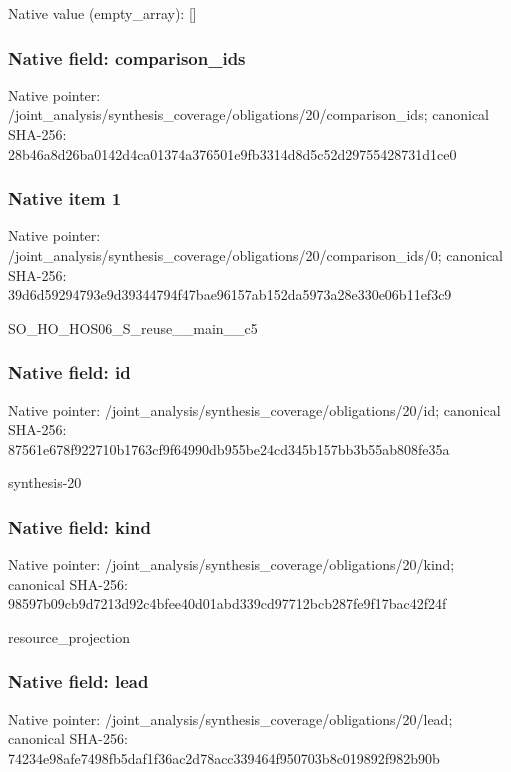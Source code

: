 \documentclass[10pt,a4paper]{article}
\begin{document}
Native value (empty\_\allowbreak{}array): []

\subsubsection{Native field: comparison\_\allowbreak{}ids}
Native pointer: /joint\_\allowbreak{}analysis/synthesis\_\allowbreak{}coverage/obligations/20/comparison\_\allowbreak{}ids; canonical SHA-256: 28b46a8d26ba0142d4ca01374a376501e9fb3314d8d5c52d29755428731d1ce0

\subsubsection{Native item 1}
Native pointer: /joint\_\allowbreak{}analysis/synthesis\_\allowbreak{}coverage/obligations/20/comparison\_\allowbreak{}ids/0; canonical SHA-256: 39d6d59294793e9d39344794f47bae96157ab152da5973a28e330e06b11ef3c9

\begingroup\raggedright\sloppy SO\_\allowbreak{}HO\_\allowbreak{}HOS06\_\allowbreak{}S\_\allowbreak{}reuse\_\allowbreak{}\_\allowbreak{}main\_\allowbreak{}\_\allowbreak{}c5\par\endgroup

\subsubsection{Native field: id}
Native pointer: /joint\_\allowbreak{}analysis/synthesis\_\allowbreak{}coverage/obligations/20/id; canonical SHA-256: 87561e678f922710b1763cf9f64990db955be24cd345b157bb3b55ab808fe35a

\begingroup\raggedright\sloppy synthesis-20\par\endgroup

\subsubsection{Native field: kind}
Native pointer: /joint\_\allowbreak{}analysis/synthesis\_\allowbreak{}coverage/obligations/20/kind; canonical SHA-256: 98597b09cb9d7213d92c4bfee40d01abd339cd97712bcb287fe9f17bac42f24f

\begingroup\raggedright\sloppy resource\_\allowbreak{}projection\par\endgroup

\subsubsection{Native field: lead}
Native pointer: /joint\_\allowbreak{}analysis/synthesis\_\allowbreak{}coverage/obligations/20/lead; canonical SHA-256: 74234e98afe7498fb5daf1f36ac2d78acc339464f950703b8c019892f982b90b
\end{document}

